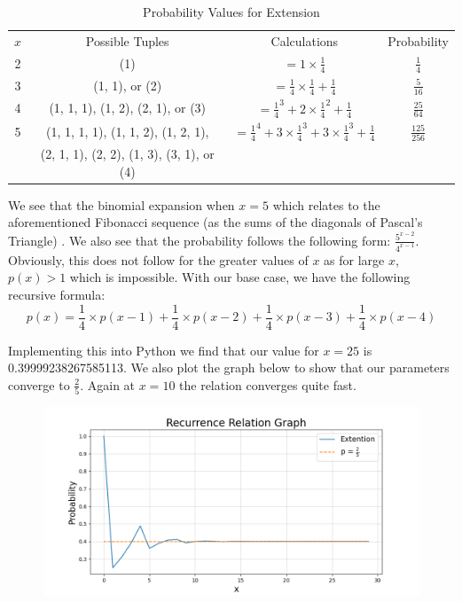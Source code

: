 \documentclass[11pt]{article}
\newcommand{\keywordfont}{\textsc}
\newcommand{\keyword}[1]{%
  \marginpar{\raggedright\small\keywordfont{#1}}}
\begin{document}
\begin{table}[h]
    \centering
    \begin{tabular}{cccc}
         $x$&  Possible Tuples&  Calculations& Probability\\
         2&  (1)&  $= 1 \times \frac{1}{4}$& $\frac{1}{4}$\\
         3&  (1, 1), or (2)&  $=  \frac{1}{4} \times \frac{1}{4} + \frac{1}{4}$& $\frac{5}{16}$\\
         4&  (1, 1, 1), (1, 2), (2, 1), or (3)&  $=  \frac{1}{4}^3 + 2 \times \frac{1}{4}^2 + \frac{1}{4}$& $\frac{25}{64}$\\
         5&  (1, 1, 1, 1), (1, 1, 2), (1, 2, 1),&  $=  \frac{1}{4}^4 + 3 \times \frac{1}{4}^3 + 3 \times \frac{1}{4}^3 + \frac{1}{4}$& $\frac{125}{256}$\\
 &  (2, 1, 1), (2, 2), (1, 3), (3, 1), or (4)& &\\
    \end{tabular}
    \caption{Probability Values for Extension}
    \label{tab:my_label}
\end{table}
We see that the binomial expansion when $x=5$ which relates to the aforementioned Fibonacci sequence (as the sums of the diagonals of Pascal's Triangle) \keyword{I know}. We also see that the probability follows the following form: $\frac{5^{x-2}}{4^{x-1}}$. Obviously, this does not follow for the greater values of $x$ as for large $x$, $p(x) > 1$ which is impossible. With our base case, we have the following recursive formula:
\[
p(x) = \frac{1}{4} \times p(x-1) + \frac{1}{4} \times p(x-2) + \frac{1}{4} \times p(x-3) + \frac{1}{4} \times p(x-4)
\]

Implementing this into \keyword{Try} Python we find that our value for $x =25$ is 0.39999238267585113. We also plot the graph below to show that our parameters converge to $\frac{2}{5}$. Again at $x=10$ the relation converges quite fast.

\begin{figure}[h]
   \centering
   \includegraphics[width=5.5in]{ExtGraph.png}
   \label{myfig}
\end{figure}
\end{document}
